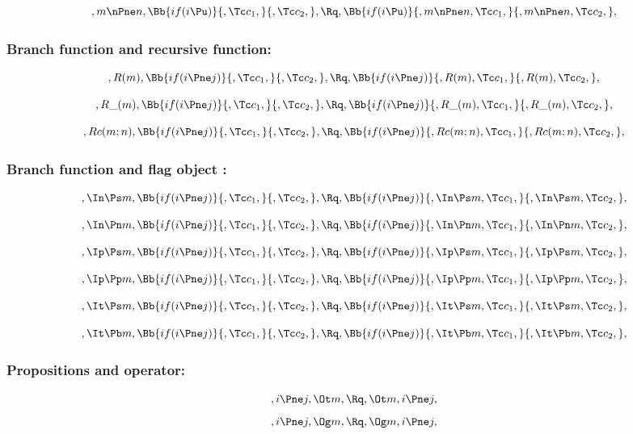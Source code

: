 \[,m \nPne n, \Bb{if(i \Pu)}{,\Tc c_1,}{,\Tc c_2,}, \Rq , \Bb{if(i \Pu)}{,m \nPne n,\Tc c_1,}{,m \nPne n,\Tc c_2,},\]
\bigskip
\bigskip






\bigskip
\bigskip
\bigskip
\bigskip
\subsubsection{Branch function and recursive function:}
\[,R(m), \Bb{if(i \Pne j)}{,\Tc c_1,}{,\Tc c_2,}, \Rq , \Bb{if(i \Pne j)}{,R(m),\Tc c_1,}{,R(m),\Tc c_2,},\]
\bigskip
\bigskip

\[,R\_(m), \Bb{if(i \Pne j)}{,\Tc c_1,}{,\Tc c_2,}, \Rq , \Bb{if(i \Pne j)}{,R\_(m),\Tc c_1,}{,R\_(m),\Tc c_2,},\]
\bigskip
\bigskip

\[,Rc(m;n), \Bb{if(i \Pne j)}{,\Tc c_1,}{,\Tc c_2,}, \Rq , \Bb{if(i \Pne j)}{,Rc(m;n),\Tc c_1,}{,Rc(m;n),\Tc c_2,},\]
\bigskip
\bigskip



\bigskip
\bigskip
\bigskip
\bigskip
\subsubsection{Branch function and flag object :}
\[,\In \Ps m, \Bb{if(i \Pne j)}{,\Tc c_1,}{,\Tc c_2,}, \Rq , \Bb{if(i \Pne j)}{,\In \Ps m,\Tc c_1,}{,\In \Ps m,\Tc c_2,},\]
\bigskip
\bigskip

\[,\In \Pn m, \Bb{if(i \Pne j)}{,\Tc c_1,}{,\Tc c_2,}, \Rq , \Bb{if(i \Pne j)}{,\In \Pn m,\Tc c_1,}{,\In \Pn m,\Tc c_2,},\]
\bigskip
\bigskip

\[,\Ip \Ps m, \Bb{if(i \Pne j)}{,\Tc c_1,}{,\Tc c_2,}, \Rq , \Bb{if(i \Pne j)}{,\Ip \Ps m,\Tc c_1,}{,\Ip \Ps m,\Tc c_2,},\]
\bigskip
\bigskip

\[,\Ip \Pp m, \Bb{if(i \Pne j)}{,\Tc c_1,}{,\Tc c_2,}, \Rq , \Bb{if(i \Pne j)}{,\Ip \Pp m,\Tc c_1,}{,\Ip \Pp m,\Tc c_2,},\]
\bigskip
\bigskip

\[,\It \Ps m, \Bb{if(i \Pne j)}{,\Tc c_1,}{,\Tc c_2,}, \Rq , \Bb{if(i \Pne j)}{,\It \Ps m, \Tc c_1,}{,\It \Ps m, \Tc c_2,},\]
\bigskip
\bigskip

\[,\It \Pb m, \Bb{if(i \Pne j)}{,\Tc c_1,}{,\Tc c_2,}, \Rq , \Bb{if(i \Pne j)}{,\It \Pb m, \Tc c_1,}{,\It \Pb m, \Tc c_2,},\]
\bigskip
\bigskip





\bigskip
\bigskip
\bigskip
\bigskip
\subsubsection{ Propositions and operator:}
\[, i \Pne j, \Ot m, \Rq , \Ot m, i \Pne j,\]
\[, i \Pne j, \Og m, \Rq , \Og m, i \Pne j,\]

